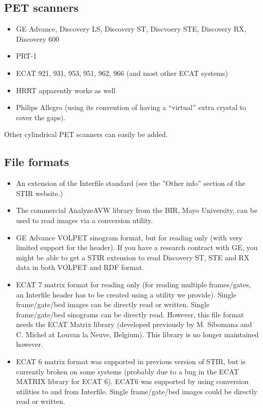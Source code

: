 \documentclass{article}
\begin{document}
\subsection{
PET scanners}
\begin{itemize}
\item 
GE Advance, Discovery LS, Discovery ST, Discvoery STE, Discovery RX,
Discovery 600 
\item 
PRT-1 
\item 
ECAT 921, 931, 953, 951, 962, 966 (and most other ECAT systems) 
\item 
HRRT apparently works as well
\item Philips Allegro (using its convention of having a ``virtual'' extra crystal to cover the gaps).
\end{itemize}

Other cylindrical PET scanners can easily be added.


\subsection{
File formats}
\begin{itemize}
\item 
An extension of the Interfile standard (see the ''Other info'' section of the STIR website.)
\item 
The commercial AnalyzeAVW library from the BIR, Mayo University, can be used
to read images via a conversion utility.
\item 
GE Advance VOLPET sinogram format, but for reading only (with 
very limited support for the header). If you have a research contract with GE,
you might be able to get a STIR extension to read Discovery ST, STE and RX data in both 
VOLPET and RDF format.
\item 
ECAT 7 matrix format for reading only (for reading multiple
frames/gates, an Interfile 
header has to be created using a utility we provide). Single 
frame/gate/bed images can be directly read or written. Single 
frame/gate/bed sinograms can be directly read.
However, this file format needs the ECAT Matrix library (developed 
previously by M. Sibomana and C. Michel at Louvan la Neuve, Belgium).
This library is no longer maintained however.
\item 
ECAT 6 matrix format was supported in previous version of STIR, but
is currently broken on some systems (probably due to a bug in the ECAT 
MATRIX library for ECAT 6). ECAT6 was supported by using conversion 
utilities to and from 
Interfile. Single frame/gate/bed images could be directly read 
or written.
\end{itemize}
\end{document}

